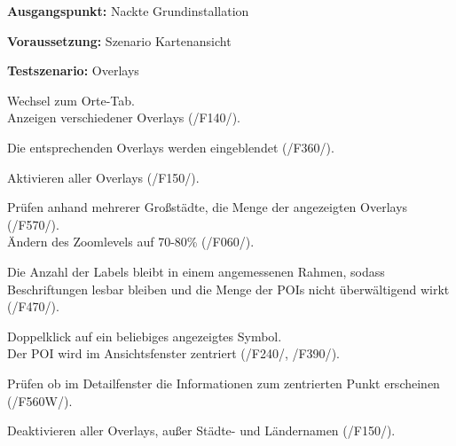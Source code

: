 \documentclass[10pt]{scrreprt}
\newcommand{\sfbf}[1]{\textbf{\sffamily #1}}
\newcommand{\ziel}[1]{{\fontsize{9.5}{11}\textsf{/#1/}}}
\newcommand{\ziellabel}{Z}
\newcommand{\muss}{\renewcommand{\labelenumi}{\textbf{\ziel{\ziellabel\numprint{\theenumi}0}}}}
\newcommand{\wunsch}{\renewcommand{\labelenumi}{\textbf{\ziel{\ziellabel\numprint{\theenumi}0W}}}}
\newenvironment{details}[1][6pt]{%
  \parskip#1 \parindent6mm \raggedright%
  \def\item{\par\ignorespaces\hangindent=5mm \hangafter1}}{%
  \par\ignorespaces}
\begin{document}
\vspace{1.0cm}
\begin{details}[2pt]
\item \sfbf{Ausgangspunkt:} Nackte Grundinstallation 
\item \sfbf{Voraussetzung:} Szenario Kartenansicht
\item \sfbf{Testszenario:} Overlays
\end{details}
\vspace{2mm}
\begin{enumerate}[leftmargin = 2.2cm, resume]
\item Wechsel zum Orte-Tab.\\Anzeigen verschiedener Overlays (\ziel{F140}).
\item Die entsprechenden Overlays werden eingeblendet (\ziel{F360}).
\item Aktivieren aller Overlays (\ziel{F150}).
\item Prüfen anhand mehrerer Großstädte, die Menge der angezeigten Overlays (\ziel{F570}).\\Ändern des Zoomlevels auf 70-80\% (\ziel{F060}).
\item Die Anzahl der Labels bleibt in einem angemessenen Rahmen, sodass Beschriftungen lesbar bleiben und die Menge der POIs nicht überwältigend wirkt (\ziel{F470}).
\item Doppelklick auf ein beliebiges angezeigtes Symbol.\\Der POI wird im Ansichtsfenster zentriert (\ziel{F240}, \ziel{F390}).
\wunsch
\item Prüfen ob im Detailfenster die Informationen zum zentrierten Punkt erscheinen (\ziel{F560W}).
\muss
\item Deaktivieren aller Overlays, außer Städte- und Ländernamen (\ziel{F150}).
\end{enumerate}
\end{document}
